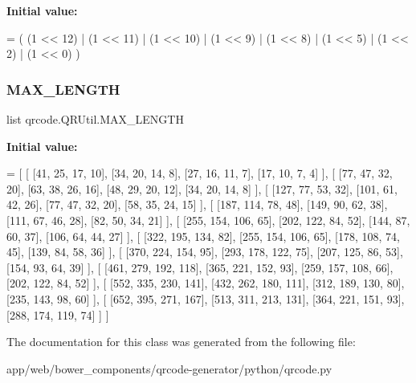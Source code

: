 {\bfseries Initial value\+:}
\begin{DoxyCode}
=  ( (1 << 12) | (1 << 11) | (1 << 10) | (1 << 9) |
            (1 << 8) | (1 << 5) | (1 << 2) | (1 << 0) )
\end{DoxyCode}
\mbox{\label{classqrcode_1_1_q_r_util_ac7ed68d145b4694db34efe09b717b0fc}} 
\subsubsection{\texorpdfstring{M\+A\+X\+\_\+\+L\+E\+N\+G\+TH}{MAX\_LENGTH}}
{\footnotesize\ttfamily list qrcode.\+Q\+R\+Util.\+M\+A\+X\+\_\+\+L\+E\+N\+G\+TH\hspace{0.3cm}{\ttfamily [static]}}

{\bfseries Initial value\+:}
\begin{DoxyCode}
=  [
        [ [41,  25,  17,  10],  [34,  20,  14,  8],   [27,  16,  11,  7],  [17,  10,  7,   4] ],
        [ [77,  47,  32,  20],  [63,  38,  26,  16],  [48,  29,  20,  12], [34,  20,  14,  8] ],
        [ [127, 77,  53,  32],  [101, 61,  42,  26],  [77,  47,  32,  20], [58,  35,  24,  15] ],
        [ [187, 114, 78,  48],  [149, 90,  62,  38],  [111, 67,  46,  28], [82,  50,  34,  21] ],
        [ [255, 154, 106, 65],  [202, 122, 84,  52],  [144, 87,  60,  37], [106, 64,  44,  27] ],
        [ [322, 195, 134, 82],  [255, 154, 106, 65],  [178, 108, 74,  45], [139, 84,  58,  36] ],
        [ [370, 224, 154, 95],  [293, 178, 122, 75],  [207, 125, 86,  53], [154, 93,  64,  39] ],
        [ [461, 279, 192, 118], [365, 221, 152, 93],  [259, 157, 108, 66], [202, 122, 84,  52] ],
        [ [552, 335, 230, 141], [432, 262, 180, 111], [312, 189, 130, 80], [235, 143, 98,  60] ],
        [ [652, 395, 271, 167], [513, 311, 213, 131], [364, 221, 151, 93], [288, 174, 119, 74] ]
        ]
\end{DoxyCode}


The documentation for this class was generated from the following file\+:\begin{DoxyCompactItemize}
\item 
app/web/bower\+\_\+components/qrcode-\/generator/python/qrcode.\+py\end{DoxyCompactItemize}
